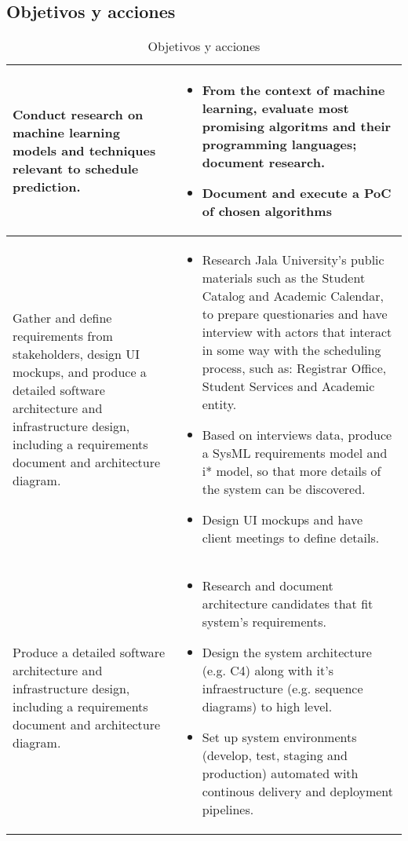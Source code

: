 \subsection{Objetivos y acciones}
\begin{longtable}{|p{3in}|p{3in}|}
\caption{Objetivos y acciones} \label{tab:objectivesNactions} \\
\hline

Conduct research on machine learning models and techniques relevant to schedule prediction. &
\begin{itemize}
    \item From the context of machine learning, evaluate most promising algoritms and their programming languages; document research.
    \item Document and execute a PoC of chosen algorithms
\end{itemize}
\\\hline

Gather and define requirements from stakeholders, design UI mockups, and produce a detailed software architecture and infrastructure design, including a requirements document and architecture diagram.&
\begin{itemize}
    \item Research Jala University's public materials such as the Student Catalog and Academic Calendar, to prepare questionaries and have interview with actors that interact in some way with the scheduling process, such as: Registrar Office, Student Services and Academic entity.
    \item Based on interviews data, produce a SysML requirements model and i* model, so that more details of the system can be discovered.
    \item Design UI mockups and have client meetings to define details.
\end{itemize}
\\\hline

Produce a detailed software architecture and infrastructure design, including a requirements document and architecture diagram. &
\begin{itemize}
    \item Research and document architecture candidates that fit system's requirements.
    \item Design the system architecture (e.g. C4) along with it's infraestructure (e.g. sequence diagrams) to high level.
    \item Set up system environments (develop, test, staging and production) automated with continous delivery and deployment pipelines.
\end{itemize}
\\\hline


\end{longtable}
